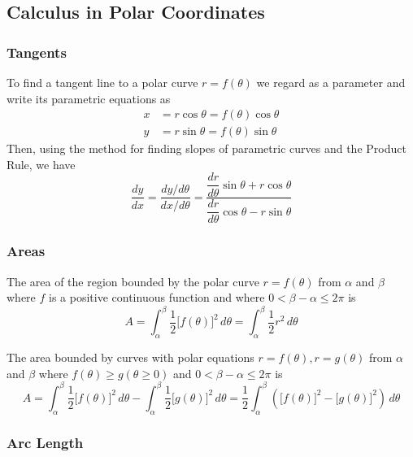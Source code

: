 \subsection{Calculus in Polar Coordinates}

\subsubsection*{Tangents}

To find a tangent line to a polar curve \(r=f(\theta)\) we regard as a
parameter and write its parametric equations as
\begin{align*}
    x &= r\cos\theta=f(\theta)\cos\theta \\
    y &= r\sin\theta=f(\theta)\sin\theta
\end{align*}
Then, using the method for finding slopes of parametric curves and the Product
Rule, we have
\[\frac{dy}{dx}=\frac{dy/d\theta}{dx/d\theta}
=\frac{\dfrac{dr}{d\theta}\sin\theta+r\cos\theta}
{\dfrac{dr}{d\theta}\cos\theta-r\sin\theta}\]

\subsubsection*{Areas}

The area of the region bounded by the polar curve \(r=f(\theta)\) from
\(\alpha\) and \(\beta\) where \(f\) is a positive continuous function and
where \(0<\beta-\alpha\leq 2\pi\) is
\[A=\int_\alpha^\beta\frac{1}{2}\big[f(\theta)\big]^2\,d\theta
=\int_\alpha^\beta\frac{1}{2}r^2\,d\theta\]

The area bounded by curves with polar equations \(r=f(\theta),r=g(\theta)\)
from \(\alpha\) and \(\beta\) where \(f(\theta)\geq g(\theta\geq 0)\) and
\(0<\beta-\alpha\leq 2\pi\) is
\[A=\int_\alpha^\beta\frac{1}{2}\big[f(\theta)\big]^2\,d\theta
-\int_\alpha^\beta\frac{1}{2}\big[g(\theta)\big]^2\,d\theta
=\frac{1}{2}\int_\alpha^\beta\left(\big[f(\theta)\big]^2
-\big[g(\theta)\big]^2\right)\,d\theta\]

\subsubsection*{Arc Length}

